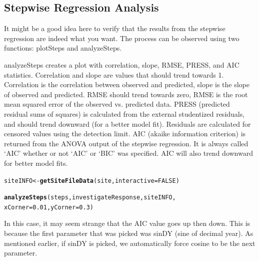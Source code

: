 \documentclass[a4paper,11pt]{article}\usepackage[]{graphicx}\usepackage[]{color}
\makeatletter
\newcommand{\hlkwd}[1]{\textcolor[rgb]{0.737,0.353,0.396}{\textbf{#1}}}%
\newenvironment{kframe}{%
 \def\at@end@of@kframe{}%
 \ifinner\ifhmode%
  \def\at@end@of@kframe{\end{minipage}}%
  \begin{minipage}{\columnwidth}%
 \fi\fi%
 \def\FrameCommand##1{\hskip\@totalleftmargin \hskip-\fboxsep
 \colorbox{shadecolor}{##1}\hskip-\fboxsep
     \hskip-\linewidth \hskip-\@totalleftmargin \hskip\columnwidth}%
 \MakeFramed {\advance\hsize-\width
   \@totalleftmargin\z@ \linewidth\hsize
   \@setminipage}}%
 {\par\unskip\endMakeFramed%
 \at@end@of@kframe}
\newenvironment{knitrout}{}{} %
\makeatother
\begin{document}
\subsection{Stepwise Regression Analysis}
It might be a good idea here to verify that the results from the stepwise regression are indeed what you want. The process can be observed using two functions: plotSteps and analyzeSteps.

\FloatBarrier
analyzeSteps creates a plot with correlation, slope, RMSE, PRESS, and AIC statistics. Correlation and slope are values that should trend towards 1. Correlation is the correlation between observed and predicted, slope is the slope of observed and predicted. RMSE should trend towards zero, RMSE is the root mean squared error of the observed vs. predicted data. PRESS (predicted residual sums of squares) is calculated from the external studentized residuals, and should trend downward (for a better model fit). Residuals are calculated for censored values using the detection limit. AIC (akaike information criterion) is returned from the ANOVA output of the stepwise regression. It is always called `AIC' whether or not `AIC' or `BIC' was specified. AIC will also trend downward for better model fits.


\begin{knitrout}
\color{fgcolor}\begin{kframe}
\begin{alltt}
siteINFO <- \hlkwd{getSiteFileData}(site, interactive=FALSE)
\end{alltt}


{\ttfamily\noindent\color{warningcolor}{Warning: unable to resolve 'waterservices.usgs.gov'}}

{\ttfamily\noindent\bfseries\color{errorcolor}{Error: cannot open the connection}}\begin{alltt}
\hlkwd{analyzeSteps}(steps, investigateResponse,siteINFO,
             xCorner=0.01,yCorner=0.3)
\end{alltt}


{\ttfamily\noindent\bfseries\color{errorcolor}{Error: object 'steps' not found}}\end{kframe}
\end{knitrout}


In this case, it may seem strange that the AIC value goes up then down. This is because the first parameter that was picked was sinDY (sine of decimal year). As mentioned earlier, if sinDY is picked, we automatically force cosine to be the next parameter. 
\end{document}
